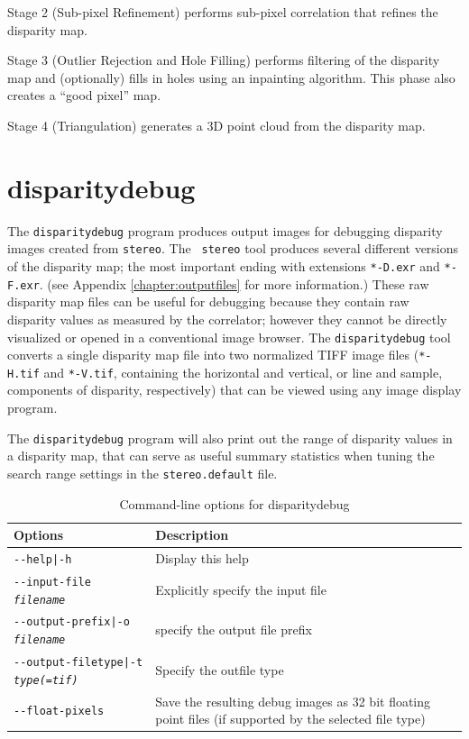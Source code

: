 Stage 2 (Sub-pixel Refinement) performs sub-pixel correlation that
refines the disparity map.

Stage 3 (Outlier Rejection and Hole Filling) performs filtering of the
disparity map and (optionally) fills in holes using an inpainting
algorithm.  This phase also creates a ``good pixel'' map.

Stage 4 (Triangulation) generates a 3D point cloud from the disparity
map.

\section{disparitydebug}
\label{disparitydebug}

The \texttt{disparitydebug} program produces output images for
debugging disparity images created from \verb#stereo#. The {\tt
stereo} tool produces several different versions of the disparity
map; the most important ending with extensions \verb#*-D.exr# and
\verb#*-F.exr#. (see Appendix \ref{chapter:outputfiles} for more
information.)  These raw disparity map files can be useful for
debugging because they contain raw disparity values as measured by
the correlator; however they cannot be directly visualized or opened
in a conventional image browser.  The \verb#disparitydebug# tool
converts a single disparity map file into two normalized TIFF image
files (\verb#*-H.tif# and \verb#*-V.tif#, containing the horizontal
and vertical, or line and sample, components of disparity, respectively)
that can be viewed using any image display program.

The {\tt disparitydebug} program will also print out the range of
disparity values in a disparity map, that can serve as useful summary
statistics when tuning the search range settings in the
{\tt stereo.default} file.

\begin{longtable}{|l|p{10cm}|}
\caption{Command-line options for disparitydebug}
\label{tbl:disparitydebug}
\endfirsthead
\endhead
\endfoot
\endlastfoot
\hline
Options & Description \\ \hline \hline
\texttt{-\/-help|-h} & Display this help\\ \hline
\texttt{-\/-input-file \textit{filename}} & Explicitly specify the input file \\ \hline
\texttt{-\/-output-prefix|-o \textit{filename}} & specify the output file prefix \\ \hline
\texttt{-\/-output-filetype|-t \textit{type(=tif)}} & Specify the outfile type \\ \hline
\texttt{-\/-float-pixels} & Save the resulting debug images as 32 bit floating point files (if supported by the selected file type) \\ \hline
\end{longtable}

